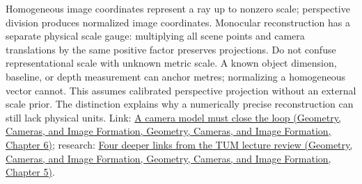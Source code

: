 Homogeneous image coordinates represent a ray up to nonzero scale; perspective division produces normalized image coordinates. Monocular reconstruction has a separate physical scale gauge: multiplying all scene points and camera translations by the same positive factor preserves projections. Do not confuse representational scale with unknown metric scale. A known object dimension, baseline, or depth measurement can anchor metres; normalizing a homogeneous vector cannot. This assumes calibrated perspective projection without an external scale prior. The distinction explains why a numerically precise reconstruction can still lack physical units. Link: \href{../03-Geometry-Cameras-and-Image-Formation/main.pdf\#nameddest=02-foundations-ii-ch037-a-camera-model-must-close-the-loop}{A camera model must close the loop (Geometry, Cameras, and Image Formation, Geometry, Cameras, and Image Formation, Chapter 6)}; research: \href{../03-Geometry-Cameras-and-Image-Formation/main.pdf\#nameddest=02-foundations-ii-ch036-four-deeper-links-from-the-tum-lecture-review}{Four deeper links from the TUM lecture review (Geometry, Cameras, and Image Formation, Geometry, Cameras, and Image Formation, Chapter 5)}.
